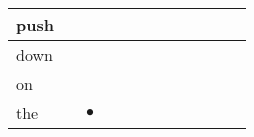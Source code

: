 \documentclass[landscape]{article}
\newcommand{\ssp}{\hspace{2pt}}
\newcommand{\mex}{\cellcolor{g}$\bullet$}
\begin{document}
\begin{tabular}{|l|p{10pt}|p{10pt}|p{10pt}|p{10pt}|p{10pt}|p{10pt}|p{10pt}|p{10pt}|p{10pt}|p{10pt}|p{10pt}|}
\hline
\ssp push \ssp&\hspace{2pt}&\hspace{2pt}&\hspace{2pt}&\hspace{2pt}&\hspace{2pt}&\hspace{2pt}&\hspace{2pt}&\hspace{2pt}&\hspace{2pt}&\hspace{2pt}&\hspace{2pt}\\
\hline
\ssp down \ssp&\hspace{2pt}&\hspace{2pt}&\hspace{2pt}&\hspace{2pt}&\hspace{2pt}&\hspace{2pt}&\hspace{2pt}&\hspace{2pt}&\hspace{2pt}&\hspace{2pt}&\hspace{2pt}\\
\hline
\ssp on \ssp&\hspace{2pt}&\hspace{2pt}&\hspace{2pt}&\hspace{2pt}&\hspace{2pt}&\hspace{2pt}&\hspace{2pt}&\hspace{2pt}&\hspace{2pt}&\hspace{2pt}&\hspace{2pt}\\
\hline
\ssp \cellcolor{ref1}the \ssp&\hspace{2pt}&\hspace{2pt}\mex&\hspace{2pt}&\hspace{2pt}&\hspace{2pt}&\hspace{2pt}&\hspace{2pt}&\hspace{2pt}&\hspace{2pt}&\hspace{2pt}&\hspace{2pt}\\

\end{tabular}
\end{document}
